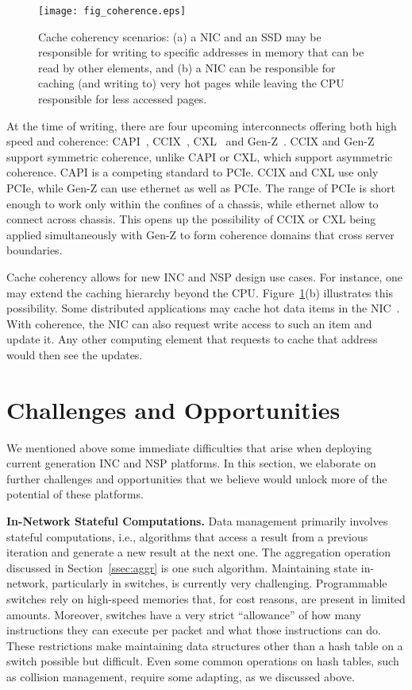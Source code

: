 \documentclass[11pt,dvipdfmx]{article}
\newcommand{\softsubsec}[1]{\vspace{0.6em}\noindent\textbf{#1}}
\begin{document}
\begin{figure}[h]
  \centering
  \texttt{[image: fig\_coherence.eps]} %
  \caption{Cache coherency scenarios: (a) a NIC and an SSD may be responsible
    for writing to specific addresses in memory that can be read by other
    elements, and (b) a NIC can be responsible for caching (and writing to) very
    hot pages while leaving the CPU responsible for less accessed pages.
  }
  \label{fig:coherence}
\end{figure}


At the time of writing, there are four upcoming interconnects offering both high speed and coherence:
CAPI~\cite{stuecheli15}, CCIX~\cite{ccix19}, CXL~\cite{cxl19} and
Gen-Z~\cite{knebel19}.
CCIX and Gen-Z support symmetric coherence, unlike CAPI or CXL, which support
asymmetric coherence.
CAPI is a competing standard to PCIe.
CCIX and CXL use only PCIe, while Gen-Z can use ethernet as well as PCIe.
The range of PCIe is short enough to work only within the confines of a chassis,
while ethernet allow to connect across chassis.
This opens up the possibility of CCIX or CXL being applied simultaneously with
Gen-Z to form coherence domains that cross server boundaries.


Cache coherency allows for new INC and NSP design use cases.
For instance, one may extend the caching hierarchy beyond the CPU.
Figure~\ref{fig:coherence}(b) illustrates this possibility.
Some distributed applications may cache hot data items in the
NIC~\cite{tokusashi18}.
With coherence, the NIC can also request write access to such an item and update
it.
Any other computing element that requests to cache that address would then see
the updates.


\section{Challenges and Opportunities}
\label{sec:challenges}

We mentioned above some immediate difficulties that arise when deploying current
generation INC and NSP platforms.
In this section, we elaborate on further challenges and opportunities that we
believe would unlock more of the potential of these platforms.


\softsubsec{In-Network Stateful Computations.}
%
Data management primarily involves stateful computations, i.e., algorithms that
access a result from a previous iteration and generate a new result at the
next one.
The aggregation operation discussed in Section~\ref{ssec:aggr} is one such
algorithm.
Maintaining state in-network, particularly in switches, is currently very
challenging.
Programmable switches rely on high-speed memories that, for cost reasons, are
present in limited amounts.
Moreover, switches have a very strict ``allowance'' of how many instructions
they can execute per packet and what those instructions can do.
These restrictions make maintaining data structures other than a hash
table on a switch possible but difficult.
Even some common operations on hash tables, such as collision management,
require some adapting, as we discussed above.
\end{document}

